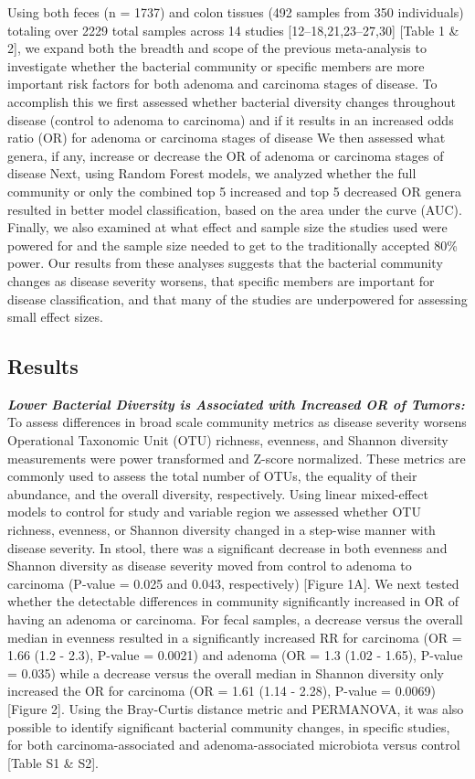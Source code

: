\documentclass[12pt,]{article}
\begin{document}
Using both feces (n = 1737) and colon tissues (492 samples from 350
individuals) totaling over 2229 total samples across 14 studies
{[}12--18,21,23--27,30{]} {[}Table 1 \& 2{]}, we expand both the breadth
and scope of the previous meta-analysis to investigate whether the
bacterial community or specific members are more important risk factors
for both adenoma and carcinoma stages of disease. To accomplish this we
first assessed whether bacterial diversity changes throughout disease
(control to adenoma to carcinoma) and if it results in an increased odds
ratio (OR) for adenoma or carcinoma stages of disease We then assessed
what genera, if any, increase or decrease the OR of adenoma or carcinoma
stages of disease Next, using Random Forest models, we analyzed whether
the full community or only the combined top 5 increased and top 5
decreased OR genera resulted in better model classification, based on
the area under the curve (AUC). Finally, we also examined at what effect
and sample size the studies used were powered for and the sample size
needed to get to the traditionally accepted 80\% power. Our results from
these analyses suggests that the bacterial community changes as disease
severity worsens, that specific members are important for disease
classification, and that many of the studies are underpowered for
assessing small effect sizes.

\newpage

\subsection{Results}\label{results}

\textbf{\emph{Lower Bacterial Diversity is Associated with Increased OR
of Tumors:}} To assess differences in broad scale community metrics as
disease severity worsens Operational Taxonomic Unit (OTU) richness,
evenness, and Shannon diversity measurements were power transformed and
Z-score normalized. These metrics are commonly used to assess the total
number of OTUs, the equality of their abundance, and the overall
diversity, respectively. Using linear mixed-effect models to control for
study and variable region we assessed whether OTU richness, evenness, or
Shannon diversity changed in a step-wise manner with disease severity.
In stool, there was a significant decrease in both evenness and Shannon
diversity as disease severity moved from control to adenoma to carcinoma
(P-value = 0.025 and 0.043, respectively) {[}Figure 1A{]}. We next
tested whether the detectable differences in community significantly
increased in OR of having an adenoma or carcinoma. For fecal samples, a
decrease versus the overall median in evenness resulted in a
significantly increased RR for carcinoma (OR = 1.66 (1.2 - 2.3), P-value
= 0.0021) and adenoma (OR = 1.3 (1.02 - 1.65), P-value = 0.035) while a
decrease versus the overall median in Shannon diversity only increased
the OR for carcinoma (OR = 1.61 (1.14 - 2.28), P-value = 0.0069)
{[}Figure 2{]}. Using the Bray-Curtis distance metric and PERMANOVA, it
was also possible to identify significant bacterial community changes,
in specific studies, for both carcinoma-associated and
adenoma-associated microbiota versus control {[}Table S1 \& S2{]}.
\end{document}
